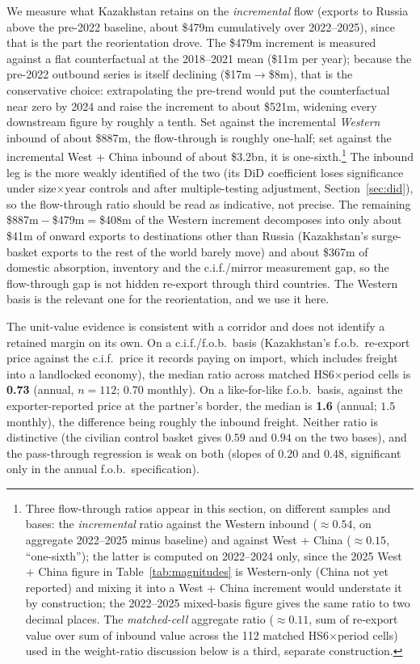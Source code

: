 \documentclass[12pt]{article}
\begin{document}
We measure what Kazakhstan retains on the \emph{incremental} flow (exports to Russia above
the pre-2022 baseline, about \$479m cumulatively over 2022--2025), since that is the part the
reorientation drove. The \$479m increment is measured against a flat counterfactual at the
2018--2021 mean (\$11m per year); because the pre-2022 outbound series is itself declining
(\$17m$\to$\$8m), that is the conservative choice: extrapolating the pre-trend would put the
counterfactual near zero by 2024 and raise the increment to about \$521m, widening every
downstream figure by roughly a tenth. Set against the incremental \emph{Western} inbound of
about \$887m, the flow-through is roughly one-half; set against the incremental West + China
inbound of about \$3.2bn, it is one-sixth.\footnote{Three flow-through ratios appear in this
section, on different samples and bases: the \emph{incremental} ratio against the Western
inbound ($\approx 0.54$, on aggregate 2022--2025 minus baseline) and against West + China
($\approx 0.15$, ``one-sixth''); the latter is computed on 2022--2024 only, since the 2025
West + China figure in Table~\ref{tab:magnitudes} is Western-only (China not yet reported) and
mixing it into a West + China increment would understate it by construction; the
2022--2025 mixed-basis figure gives the same ratio to two decimal places. The
\emph{matched-cell} aggregate ratio
($\approx 0.11$, sum of re-export value over sum of inbound value across the 112 matched
HS6$\times$period cells) used in the weight-ratio discussion below is a third, separate
construction.} The inbound leg is the more weakly identified of
the two (its DiD coefficient loses significance under size$\times$year controls and after
multiple-testing adjustment, Section~\ref{sec:did}), so the flow-through ratio should be read
as indicative, not precise. The remaining \$887m${}-{}$\$479m${}={}$\$408m of
the Western increment decomposes into only about \$41m of onward exports to destinations other
than Russia (Kazakhstan's surge-basket exports to the rest of the world barely move) and about
\$367m of domestic absorption, inventory and the c.i.f./mirror measurement gap, so the
flow-through gap is not hidden re-export through third countries. The Western basis is the
relevant one for the reorientation, and we use it here.

The unit-value evidence is consistent with a corridor and does not identify a retained margin
on its own. On a c.i.f./f.o.b.\ basis (Kazakhstan's f.o.b.\ re-export price against the
c.i.f.\ price it records paying on import, which includes freight into a landlocked
economy), the median ratio across matched HS6$\times$period cells is \textbf{0.73} (annual,
$n = 112$; $0.70$ monthly). On a like-for-like f.o.b.\ basis, against the exporter-reported
price at the partner's border, the median is \textbf{1.6} (annual; $1.5$ monthly), the
difference being roughly the inbound freight. Neither ratio is distinctive (the civilian
control basket gives $0.59$ and $0.94$ on the two bases), and the pass-through regression is
weak on both (slopes of $0.20$ and $0.48$, significant only in the annual f.o.b.\
specification).
\end{document}
